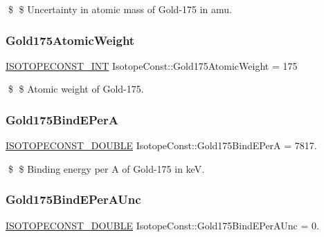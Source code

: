 \$ \$ Uncertainty in atomic mass of Gold-\/175 in amu. \mbox{\label{group___isotope_const-_gold-_au175_ga06ee3b760bcc73bf0d9e76ae8347c91a}} 
\subsubsection{\texorpdfstring{Gold175\+Atomic\+Weight}{Gold175AtomicWeight}}
{\footnotesize\ttfamily \mbox{\hyperlink{group___isotope_const-_macros_ga5f18360b3e99483a35c32d789e62621c}{I\+S\+O\+T\+O\+P\+E\+C\+O\+N\+S\+T\+\_\+\+I\+NT}} Isotope\+Const\+::\+Gold175\+Atomic\+Weight = 175}

\$ \$ Atomic weight of Gold-\/175. \mbox{\label{group___isotope_const-_gold-_au175_gad31810ab64ff4ce651dfd4fe3f13d73b}} 
\subsubsection{\texorpdfstring{Gold175\+Bind\+E\+PerA}{Gold175BindEPerA}}
{\footnotesize\ttfamily \mbox{\hyperlink{group___isotope_const-_macros_ga8f45a7272ce02c0b4c65c44636ed719a}{I\+S\+O\+T\+O\+P\+E\+C\+O\+N\+S\+T\+\_\+\+D\+O\+U\+B\+LE}} Isotope\+Const\+::\+Gold175\+Bind\+E\+PerA = 7817.}

\$ \$ Binding energy per A of Gold-\/175 in keV. \mbox{\label{group___isotope_const-_gold-_au175_gab24de39029b0da5894b8aa5f3a05f499}} 
\subsubsection{\texorpdfstring{Gold175\+Bind\+E\+Per\+A\+Unc}{Gold175BindEPerAUnc}}
{\footnotesize\ttfamily \mbox{\hyperlink{group___isotope_const-_macros_ga8f45a7272ce02c0b4c65c44636ed719a}{I\+S\+O\+T\+O\+P\+E\+C\+O\+N\+S\+T\+\_\+\+D\+O\+U\+B\+LE}} Isotope\+Const\+::\+Gold175\+Bind\+E\+Per\+A\+Unc = 0.}

